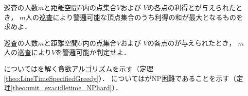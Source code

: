 \begin{timeSpecifiedPatrollingProblem}
  巡査の人数$m$と距離空間$U$内の点集合$V$および
  $V$の各点の利得と{\exactidletime}が与えられたとき，
  $m$人の巡査により警邏可能な頂点集合のうち利得の和が最大となるものを求めよ．
\end{timeSpecifiedPatrollingProblem}

\begin{timeSpecifiedPatrollingProblemDecision}
  巡査の人数$m$と距離空間$U$内の点集合$V$および
  $V$の各点の{\exactidletime}が与えられたとき，
  $m$人の巡査により$V$を警邏可能か判定せよ．
\end{timeSpecifiedPatrollingProblemDecision}


{\graphLine}については{\timeSpecifiedPatProbDecision}を解く貪欲アルゴリズムを示す（定理\ref{theo:LineTimeSpecifiedGreedy}）．
{\graphUnit}については{\timeSpecifiedPatProb}がNP困難であることを示す（定理\ref{theo:unit_exacidletime_NPhard}）．
